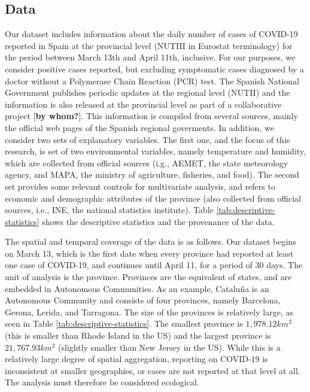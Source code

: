 \documentclass[]{elsarticle} %
\begin{document}
\hypertarget{data}{%
\subsection{Data}\label{data}}

Our dataset includes information about the daily number of cases of
COVID-19 reported in Spain at the provincial level (NUTIII in Eurostat
terminology) for the period between March 13th and April 11th,
inclusive. For our purposes, we consider positive cases reported, but
excluding symptomatic cases diagnosed by a doctor without a Polymerase
Chain Reaction (PCR) test. The Spanish National Government publishes
periodic updates at the regional level (NUTII) and the information is
also released at the provincial level as part of a collaborative project
{[}\textbf{by whom?}{]}. This information is compiled from several
sources, mainly the official web pages of the Spanish regional
goverments. In addition, we consider two sets of explanatory variables.
The first one, and the focus of this research, is set of two
environmental variables, namely temperature and humidity, which are
collected from official sources (i.g., AEMET, the state meteorology
agency, and MAPA, the ministry of agriculture, fisheries, and food). The
second set provides some relevant controls for multivariate analysis,
and refers to economic and demographic attributes of the province (also
collected from official sources, i.e., INE, the national statistics
institute). Table \ref{tab:descriptive-statistics} shows the descriptive
statistics and the provenance of the data.

The spatial and temporal coverage of the data is as follows. Our dataset
begins on March 13, which is the first date when every province had
reported at least one case of COVID-19, and continues until April 11,
for a period of 30 days. The unit of analysis is the province. Provinces
are the equivalent of states, and are embedded in Autonomous
Communities. As an example, Cataluña is an Autonomous Community and
consists of four provinces, namely Barcelona, Gerona, Lerida, and
Tarragona. The size of the provinces is relatively large, as seen in
Table \ref{tab:descriptive-statistics}. The smallest province is
\(1,978.12km^2\) (this is smaller than Rhode Island in the US) and the
largest province is \(21,767.93km^2\) (slightly smaller than New Jersey
in the US). While this is a relatively large degree of spatial
aggregation, reporting on COVID-19 is inconsistent at smaller
geographies, or cases are not reported at that level at all. The
analysis must therefore be considered ecological.
\end{document}
